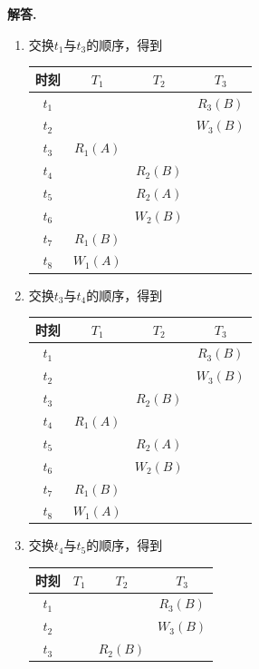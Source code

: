\documentclass[12pt, oneside]{ctexart}
\numberwithin{figure}{section}
\numberwithin{table}{section}
\newenvironment{solution}{\par\noindent\textbf{解答. }}{\par}
\begin{document}
\begin{solution}
    \begin{enumerate}[$1^\circ$]
        \item 交换$t_1$与$t_3$的顺序，得到
            \begin{longtable}{c|ccc}
                \textbf{时刻} & \bf $T_1$ & \bf $T_2$ & \bf $T_3$ \\
                \hline
                $t_1$ & & & $R_3(B)$ \\
                $t_2$ & & & $W_3(B)$ \\
                $t_3$ & $R_1(A)$ & & \\
                $t_4$ & & $R_2(B)$ & \\
                $t_5$ & & $R_2(A)$ & \\
                $t_6$ & & $W_2(B)$ & \\
                $t_7$ & $R_1(B)$ & & \\
                $t_8$ & $W_1(A)$ & & \\
            \end{longtable}
        \item 交换$t_3$与$t_4$的顺序，得到
            \begin{longtable}{c|ccc}
                \textbf{时刻} & \bf $T_1$ & \bf $T_2$ & \bf $T_3$ \\
                \hline
                $t_1$ & & & $R_3(B)$ \\
                $t_2$ & & & $W_3(B)$ \\
                $t_3$ & & $R_2(B)$ & \\
                $t_4$ & $R_1(A)$ & & \\
                $t_5$ & & $R_2(A)$ & \\
                $t_6$ & & $W_2(B)$ & \\
                $t_7$ & $R_1(B)$ & & \\
                $t_8$ & $W_1(A)$ & & \\
            \end{longtable}
        \item 交换$t_4$与$t_5$的顺序，得到
            \begin{longtable}{c|ccc}
                \textbf{时刻} & \bf $T_1$ & \bf $T_2$ & \bf $T_3$ \\
                \hline
                $t_1$ & & & $R_3(B)$ \\
                $t_2$ & & & $W_3(B)$ \\
                $t_3$ & & $R_2(B)$ & \\

\end{longtable}
\end{enumerate}
\end{solution}
\end{document}
